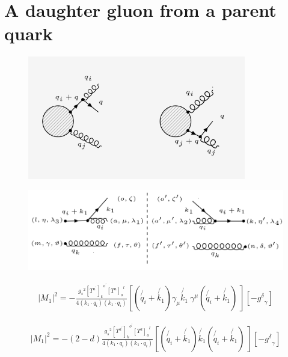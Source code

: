 \section{A daughter gluon from a parent quark}
\begin{figure}[ht!]
\centering
\includegraphics[width=0.85\textwidth]{images/GQ/GQDiagrams.png}
\end{figure}


\begin{figure}[ht!]
\centering
\includegraphics[scale=0.7]{images/GQ/M1Squer.png}
\end{figure}

\begin{equation}
\begin{split}
|M_1|^2=-\frac{{g_s}^2 {[T^{a^{\prime}}]_k}^{o^{\prime}} {[T^a]_{o}}^{l}}{4(k_1 \cdot q_i)(k_1 \cdot q_i)}[(\not{q_i}+\not{k_1}) {\gamma}_{{\mu}}\not{k_1}\:{\gamma}^{\mu}(\not{q_i}+\not{k_1})\:][-{g^{\delta}}_{\gamma}]
\end{split}
\end{equation}

\begin{equation}
\begin{split}
|M_1|^2=-(2-d)\frac{{g_s}^2 {[T^{a^{\prime}}]_k}^{o^{\prime}} {[T^a]_{o}}^{l}}{4(k_1 \cdot q_i)(k_1 \cdot q_i)}[(\not{q_i}+\not{k_1}) \not{k_1}(\not{q_i}+\not{k_1})\:][-{g^{\delta}}_{\gamma}]
\end{split}
\end{equation}


